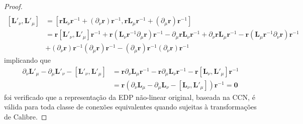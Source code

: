 \documentclass[25pt]{article}
\numberwithin{equation}{subsection} %
\newcommand{\commutador}[2]{\left[#1,#2\right]}
\begin{document}
\begin{proof}
\begin{align}
	\end{align}
	\begin{align}
	\commutador{{\mathbf{L}'}_\nu}{{\mathbf{L}'}_\mu}&=\commutador{\mathbf{r}\mathbf{L}_{\nu}\mathbf{r}^{-1}+\left(\partial_\nu\mathbf{r}\right)\mathbf{r}^{-1}}{\mathbf{r}\mathbf{L}_{\mu}\mathbf{r}^{-1}+\left(\partial_\mu\mathbf{r}\right)\mathbf{r}^{-1}}\\
	&=\mathbf{r}\commutador{{\mathbf{L}'}_\nu}{{\mathbf{L}'}_\mu}\mathbf{r}^{-1}+\mathbf{r}\left(\mathbf{L}_\nu\mathbf{r}^{-1}\partial_\mu \mathbf{r}\right)\mathbf{r}^{-1}-\partial_\mu\mathbf{r}\mathbf{L}_\nu\mathbf{r}^{-1}+\partial_\nu\mathbf{r}\mathbf{L}_{\mu}\mathbf{r}^{-1}-\mathbf{r}\left(\mathbf{L}_\mu\mathbf{r}^{-1}\partial_\nu\mathbf{r}\right)\mathbf{r}^{-1}\\
	&+\left(\partial_\nu\mathbf{r}\right)\mathbf{r}^{-1}\left(\partial_\mu\mathbf{r}\right)\mathbf{r}^{-1}-\left(\partial_\mu\mathbf{r}\right)\mathbf{r}^{-1}\left(\partial_\nu\mathbf{r}\right)\mathbf{r}^{-1}
	\end{align}
	implicando que
	\begin{align}
	\partial_\nu{\mathbf{L}'}_{\mu}-\partial_\mu{\mathbf{L}'}_{\nu}-\commutador{{\mathbf{L}'}_\nu}{{\mathbf{L}'}_\mu}&=\mathbf{r}\partial_\nu{\mathbf{L}_\mu}\mathbf{r}^{-1}-\mathbf{r}\partial_\mu{\mathbf{L}_\nu}\mathbf{r}^{-1}-\mathbf{r}\commutador{\mathbf{L}_\nu}{{\mathbf{L}'}_\mu}\mathbf{r}^{-1}\\
	&=\mathbf{r}\left(\partial_\nu{\mathbf{L}_\mu}-\partial_\mu{\mathbf{L}_\nu}-\commutador{\mathbf{L}_\nu}{{\mathbf{L}'}_\mu}\right)\mathbf{r}^{-1}=\mathbf{0}
	\end{align}
	foi verificado que a representação da EDP não-linear original, baseada na CCN, é válida para toda classe de conexões equivalentes quando sujeitas à transformações de Calibre.
\end{proof}
\end{document}
